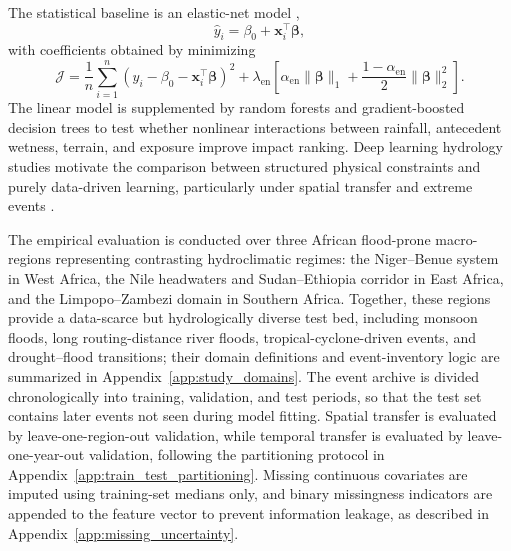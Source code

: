 \documentclass[pdflatex,sn-mathphys-ay]{sn-jnl}
\theoremstyle{thmstyleone}
\begin{document}
The statistical baseline is an elastic-net model
\citep{Tibshirani1996,Zou2005regvars},
\begin{equation}
  \hat{y}_{i}
  =
  \beta_{0}
  +
  \mathbf{x}_{i}^{\top}\boldsymbol{\beta},
  \label{eq:elastic_prediction}
\end{equation}
with coefficients obtained by minimizing
\begin{equation}
  \mathcal{J}
  =
  \frac{1}{n}
  \sum_{i=1}^{n}
  \left(
    y_i
    -
    \beta_{0}
    -
    \mathbf{x}_{i}^{\top}\boldsymbol{\beta}
  \right)^2
  +
  \lambda_{\mathrm{en}}
  \left[
    \alpha_{\mathrm{en}}
    \|\boldsymbol{\beta}\|_{1}
    +
    \frac{1-\alpha_{\mathrm{en}}}{2}
    \|\boldsymbol{\beta}\|_{2}^{2}
  \right].
  \label{eq:elastic_loss}
\end{equation}
The linear model is supplemented by random forests and gradient-boosted
decision trees \citep{Breiman2001RandomForests,ChenGuestrin2016,Ke2017}
to test whether nonlinear interactions between rainfall,
antecedent wetness, terrain, and exposure improve impact ranking.  Deep
learning hydrology studies motivate the comparison between structured
physical constraints and purely data-driven learning, particularly under
spatial transfer and extreme events \citep{Kratzert2019,Nearing2024}.

The empirical evaluation is conducted over three African flood-prone
macro-regions representing contrasting hydroclimatic regimes: the
Niger--Benue system in West Africa, the Nile headwaters and
Sudan--Ethiopia corridor in East Africa, and the Limpopo--Zambezi
domain in Southern Africa.  Together, these regions provide a
data-scarce but hydrologically diverse test bed, including monsoon
floods, long routing-distance river floods, tropical-cyclone-driven
events, and drought--flood transitions; their domain definitions and
event-inventory logic are summarized in
Appendix~\ref{app:study_domains}.  The event archive is divided
chronologically into training, validation, and test periods, so that the
test set contains later events not seen during model fitting.  Spatial
transfer is evaluated by leave-one-region-out validation, while temporal
transfer is evaluated by leave-one-year-out validation, following the
partitioning protocol in Appendix~\ref{app:train_test_partitioning}.
Missing continuous covariates are imputed using training-set medians
only, and binary missingness indicators are appended to the feature
vector to prevent information leakage, as described in
Appendix~\ref{app:missing_uncertainty}.
\end{document}
